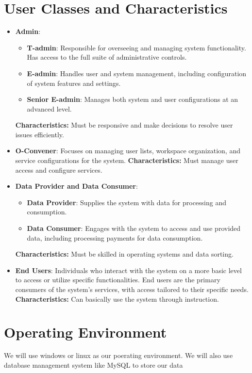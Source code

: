 \section{User Classes and Characteristics}
\begin{itemize}
    \item \textbf{Admin}:
    \begin{itemize}
        \item \textbf{T-admin}: Responsible for overseeing and managing system functionality. Has access to the full suite of administrative controls.
        \item \textbf{E-admin}: Handles user and system management, including configuration of system features and settings.
        \item \textbf{Senior E-admin}: Manages both system and user configurations at an advanced level.
    \end{itemize}
    \textbf{Characteristics:} Must be responsive and make decisions to resolve user issues efficiently.
    
    \item \textbf{O-Convener}: Focuses on managing user lists, workspace organization, and service configurations for the system.  
    \textbf{Characteristics:} Must manage user access and configure services.

    \item \textbf{Data Provider and Data Consumer}:
    \begin{itemize}
        \item \textbf{Data Provider}: Supplies the system with data for processing and consumption.
        \item \textbf{Data Consumer}: Engages with the system to access and use provided data, including processing payments for data consumption.
    \end{itemize}
    \textbf{Characteristics:} Must be skilled in operating systems and data sorting.

    \item \textbf{End Users}: Individuals who interact with the system on a more basic level to access or utilize specific functionalities. End users are the primary consumers of the system's services, with access tailored to their specific needs.  
    \textbf{Characteristics:} Can basically use the system through instruction.
\end{itemize}

\section{Operating Environment}
We will use windows or linux as our poerating environment. We will also use database management system like MySQL to store our data


